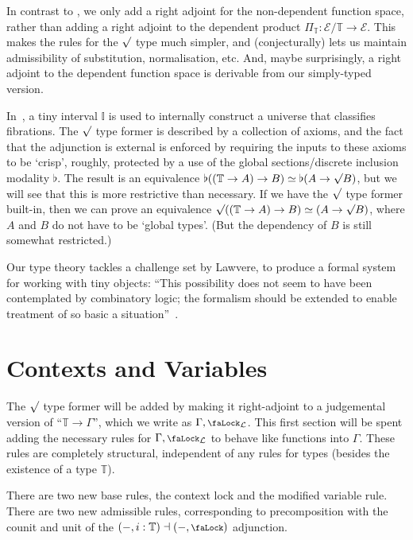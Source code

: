 \documentclass[10pt]{article}
\theoremstyle{definition}
\renewcommand{\equiv}{\simeq}
\newcommand{\lock}{\mathchoice {\scalebox{0.8}{\text{\faLock}}}
  {\scalebox{0.8}{\text{\faLock}}} {\scalebox{0.5}{\text{\faLock}}}
  {\scalebox{0.4}{\text{\faLock}}} }
\newcommand{\Tiny}{\mathbb{T}}
\newcommand{\lockn}[1]{\mathcal{#1}}
\newcommand{\ctxlocke}[1]{\lock_{#1}}
\newcommand{\ctxlock}[1]{\ctxlocke{\lockn{#1}}}
\newcommand{\rformu}[1]{\ThisStyle{\raisebox{0.07em}{$\SavedStyle \surd$}} #1}
\begin{document}
In contrast to \cite[Section 2]{transpension}, we only add a right
adjoint for the non-dependent function space, rather than adding a
right adjoint to the dependent product
$\Pi_\Tiny : \mathcal{E}/\Tiny \to \mathcal{E}$. This makes the rules
for the $\rformu$ type much simpler, and (conjecturally) lets us
maintain admissibility of substitution, normalisation, etc. And, maybe
surprisingly, a right adjoint to the dependent function space is
derivable from our simply-typed version.

In~\cite{lops}, a tiny interval $\mathbb{I}$ is used to internally
construct a universe that classifies fibrations. The $\rformu$ type
former is described by a collection of axioms, and the fact that the
adjunction is external is enforced by requiring the inputs to these
axioms to be `crisp', roughly, protected by a use of the global
sections/discrete inclusion modality $\flat$. The result is an
equivalence
$\flat((\Tiny \to A) \to B) \equiv \flat(A \to \rformu B)$, but we
will see that this is more restrictive than necessary. If we have the
$\rformu$ type former built-in, then we can prove an equivalence
$\rformu ((\Tiny \to A) \to B) \equiv (A \to \rformu B)$, where $A$
and $B$ do not have to be `global types'. (But the dependency of $B$
is still somewhat restricted.)

Our type theory tackles a challenge set by Lawvere, to produce a
formal system for working with tiny objects: ``This possibility does
not seem to have been contemplated by combinatory logic; the formalism
should be extended to enable treatment of so basic a
situation''~\cite[Section 3]{lawvere:adjoints}.


\section{Contexts and Variables}

The $\rformu$ type former will be added by making it right-adjoint to
a judgemental version of ``$\Tiny \to \Gamma$'', which we write as
$\Gamma, \ctxlock{L}$. This first section will be spent adding the
necessary rules for $\Gamma, \ctxlock{L}$ to behave like functions
into $\Gamma$. These rules are completely structural, independent of
any rules for types (besides the existence of a type $\Tiny$).

There are two new base rules, the context lock and the modified
variable rule. There are two new admissible rules, corresponding to
precomposition with the counit and unit of the
$(-,i:\Tiny) \dashv (-,\lock)$ adjunction.
\end{document}
